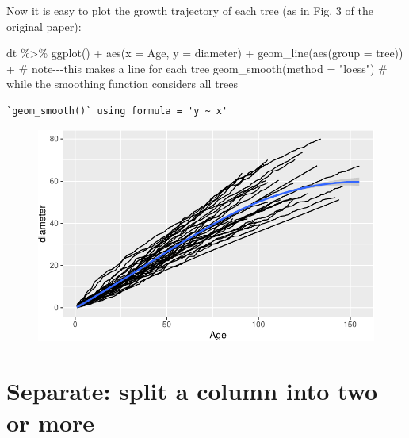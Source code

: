 \documentclass[
  letterpaper,
  DIV=11,
  numbers=noendperiod]{scrreprt}
\newenvironment{Shaded}{\begin{snugshade}}{\end{snugshade}}
\newcommand{\AttributeTok}[1]{\textcolor[rgb]{0.40,0.45,0.13}{#1}}
\newcommand{\CommentTok}[1]{\textcolor[rgb]{0.37,0.37,0.37}{#1}}
\newcommand{\FunctionTok}[1]{\textcolor[rgb]{0.28,0.35,0.67}{#1}}
\newcommand{\NormalTok}[1]{\textcolor[rgb]{0.00,0.23,0.31}{#1}}
\newcommand{\SpecialCharTok}[1]{\textcolor[rgb]{0.37,0.37,0.37}{#1}}
\newcommand{\StringTok}[1]{\textcolor[rgb]{0.13,0.47,0.30}{#1}}
\begin{document}
Now it is easy to plot the growth trajectory of each tree (as in Fig. 3
of the original paper):

\begin{Shaded}
\begin{Highlighting}[]
\NormalTok{dt }\SpecialCharTok{\%\textgreater{}\%} 
  \FunctionTok{ggplot}\NormalTok{() }\SpecialCharTok{+} 
  \FunctionTok{aes}\NormalTok{(}\AttributeTok{x =}\NormalTok{ Age, }\AttributeTok{y =}\NormalTok{ diameter) }\SpecialCharTok{+} 
  \FunctionTok{geom\_line}\NormalTok{(}\FunctionTok{aes}\NormalTok{(}\AttributeTok{group =}\NormalTok{ tree)) }\SpecialCharTok{+} \CommentTok{\# note{-}{-}{-}this makes a line for each tree}
  \FunctionTok{geom\_smooth}\NormalTok{(}\AttributeTok{method =} \StringTok{"loess"}\NormalTok{) }\CommentTok{\# while the smoothing function considers all trees}
\end{Highlighting}
\end{Shaded}

\begin{verbatim}
`geom_smooth()` using formula = 'y ~ x'
\end{verbatim}

\begin{figure}[H]

{\centering \includegraphics{./03-wrangling_files/figure-pdf/unnamed-chunk-23-1.pdf}

}

\end{figure}

\hypertarget{separate-split-a-column-into-two-or-more}{%
\section{Separate: split a column into two or
more}\label{separate-split-a-column-into-two-or-more}}
\end{document}
